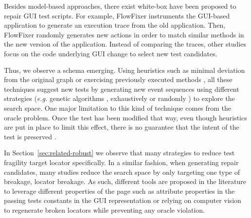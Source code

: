 Besides model-based approaches, there exist white-box have been proposed to repair GUI test scripts. For example, FlowFixer \cite{Zhang2013} instruments the GUI-based application to generate an execution trace from the old application. Then, FlowFixer randomly generates new actions in order to match similar methods in the new version of the application. Instead of comparing the traces, other studies \cite{Grechanik2009, Fu2009} focus on the code underlying GUI change to select new test candidates.

Thus, we observe a schema emerging. Using heuristics such as minimal deviation from the original graph\cite{Gao2016} or exercising previously executed methods \cite{Zhang}, all these techniques suggest new tests by generating new event sequences using different strategies (\emph{e.g.} genetic algorithms \cite{Huang2010}, exhaustively \cite{Memon2008} or randomly \cite{Zhang2013}) to explore the search space. One major limitation to this kind of technique comes from the oracle problem. Once the test has been modified that way, even though heuristics are put in place to limit this effect, there is no guarantee that the intent of the test is preserved \cite{Li2019}.


In Section~\ref{sec:related-robust} we observe that many strategies to reduce test fragility target locator specifically. In a similar fashion, when generating repair candidates, many studies reduce the search space by only targeting one type of breakage, locator breakage. As such, different tools are proposed in the literature to leverage different properties of the page such as attribute properties in the passing tests\cite{Choudhary2011} constants in the GUI representation\cite{Kirinuki2019} or relying on computer vision\cite{Stocco2018} to regenerate broken locators while preventing any oracle violation.




